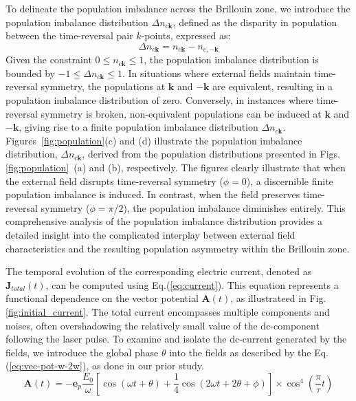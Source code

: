 To delineate the population imbalance across the Brillouin zone, we introduce the population imbalance distribution $\Delta n_{c\mathbf{k}}$, defined as the disparity in population between the time-reversal pair $k$-points, expressed as:
\begin{equation}
 \Delta n_{c\mathbf{k}}=n_{c\mathbf{k}}-n_{c, -\mathbf{k}}  
\label{pop_imbalance }
\end{equation}
Given the constraint $0 \le n_{c\mathbf{k}} \le 1$, the population imbalance distribution is bounded by $-1 \le \Delta n_{c\mathbf{k}} \le 1$. In situations where external fields maintain time-reversal symmetry, the populations at $\mathbf{k}$ and $-\mathbf{k}$ are equivalent, resulting in a population imbalance distribution of zero. Conversely, in instances where time-reversal symmetry is broken, non-equivalent populations can be induced at $\mathbf{k}$ and $-\mathbf{k}$, giving rise to a finite population imbalance distribution $\Delta n_{c\mathbf{k}}$.
Figures~\ref{fig:population}(c) and (d) illustrate the population imbalance distribution, $\Delta n_{c\mathbf{k}}$, derived from the population distributions presented in Figs.\ref{fig:population}~(a) and (b), respectively. The figures clearly illustrate that when the external field disrupts time-reversal symmetry ($\phi=0$), a discernible finite population imbalance is induced. In contrast, when the field preserves time-reversal symmetry ($\phi=\pi/2$), the population imbalance diminishes entirely. This comprehensive analysis of the population imbalance distribution provides a detailed insight into the complicated interplay between external field characteristics and the resulting population asymmetry within the Brillouin zone.


The temporal evolution of the corresponding electric current, denoted as $\mathbf{J}_{total}(t)$, can be computed using Eq.(\ref{eq:current}). This equation represents a functional dependence on the vector potential $\mathbf{A}(t)$, as illustrateed in Fig.\ref{fig:initial_current}. The total current encompasses multiple components and noises, often overshadowing the relatively small value of the dc-component following the laser pulse. To examine and isolate the dc-current generated by the fields, we introduce the global phase $\theta$ into the fields as described by the Eq.(\ref{eq:vec-pot-w-2w}), as done in our prior study\cite{sato2023limitations}.
\begin{equation}
\mathbf{A}(t) = -\mathbf{e}_p \frac{E_0}{\omega} \left [
\cos \left (\omega t + \theta \right ) + \frac{1}{4}\cos
\left (2\omega t + 2\theta + \phi \right )
\right ] \times \cos^4 \left (\frac{\pi}{\tau}t \right )
\label{eq:vec-pot-w-2w}
\end{equation}


